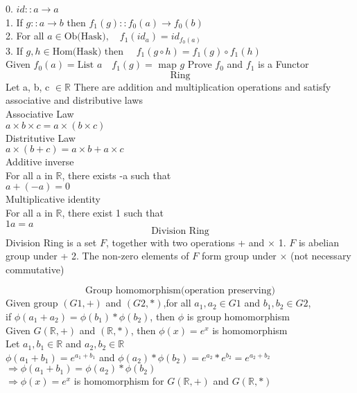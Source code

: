 \documentclass[10pt]{article}
\begin{document}
0. $id::a \rightarrow a $ \\
1. If $g::a \rightarrow b $ then $f_1(g)::f_0(a) \rightarrow f_0(b)$ \\
2. For all $a \in \mbox{Ob(Hask)}, \quad f_1(id_a) = id_{f_0(a)} $ \\
3. If $g,h \in \mbox{Hom(Hask)} \mbox{ then } \quad f_1(g \circ h) = f_1(g) \circ f_1(h)$ \\
Given $f_0(a) = \mbox{List } a \quad f_1(g) = \mbox{ map } g   $ \medskip 
Prove $f_0$ and $f_1$ is a Functor \\

\[ \text{ Ring } \]
Let a, b, c $\in  \mathbb{R}$ There are addition and multiplication operations and satisfy associative and distributive laws\\

Associative Law\\
$ a \times b \times c = a \times (b \times c) $\\

Distritutive Law\\
$a \times (b + c) = a \times b + a \times c $\\

Additive inverse\\
For all a in $\mathbb{R}$, there exists -a such that\\
$a + (-a) = 0$\\

Multiplicative identity \\
For all a in $\mathbb{R}$, there exist 1 such that\\
$1a = a$ \\

\[ \text{Division Ring} \] 
Division Ring is a set $F$, together with two operations + and $\times$ 
1. $F$ is abelian group under +
2. The non-zero elements of $F$ form group under $\times$ (not necessary commutative)

\[\text{Group homomorphism(operation preserving)}\]
Given group $(G1, +)$ and $(G2, *)$,for all $a_1, a_2 \in G1$ and $b_1, b_2 \in G2$,\\
if $\phi(a_1 + a_2) = \phi(b_1)*\phi(b_2)$, then $\phi$ is group homomorphism\\

Given $G(\mathbb{R}, +)$ and $(\mathbb{R}, *)$, then $\phi(x) = e^x$ is homomorphism\\ 
Let $a_1, b_1 \in \mathbb{R}$ and $a_2, b_2 \in \mathbb{R}$\\ 
$\phi(a_1+b_1) = e^{a_1 + b_1}$ and $\phi(a_2)*\phi(b_2) = e^{a_2}*e^{b_2} = e^{a_2+b_2}$\\
$\Rightarrow \phi(a_1 + b_1) = \phi(a_2)*\phi(b_2)$\\
$\Rightarrow \phi(x) = e^{x}$ is homomorphism for $G(\mathbb{R}, +)$ and $G(\mathbb{R}, *)$
\end{document}
